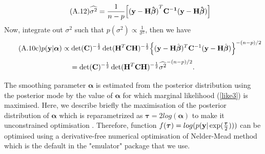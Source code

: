 \documentclass[12pt,titlepage]{report}
\newcommand{\bH}{{\bf H}}
\newcommand{\bC}{{\bf C}}
\newcommand{\by}{{\bf y}}
\newcommand{\hbbeta}{{\hat{\boldsymbol{\beta}}}}
\newcommand{\btau}{{{\boldsymbol{\tau}}}}
\theoremstyle{definition}
\theoremstyle{remark}
\begin{document}
\begin{equation}\tag{A.12}
\widehat{\sigma^2}=\frac{1}{n-p}\Big[\mathbf{(y-H\hat{\boldsymbol \beta})}^T\bf C^{-1}(\bf y-H\hat{\boldsymbol \beta})\Big]
\end{equation}
Now, integrate out $\sigma^2$ such that $p(\sigma^2) \propto \frac{1}{\sigma^2}$, then we have
\begin{equation}\tag{A.10c}\label{like3}
p(\by|\boldsymbol{\alpha})\propto \det(\bC)^{-\frac{1}{2}}\det(\bH^T\bC\bH)^{-\frac{1}{2}} \Big \{(\by-\bH\hbbeta)^T \bC^{-1}(\by-\bH\hbbeta)\Big\}^{-(n-p)/2}
\end{equation}
$$=\det(\bC)^{-\frac{1}{2}}\det(\bH^T\bC\bH)^{-\frac{1}{2}} {\widehat{\sigma^2}}^{-(n-p)/2}.$$


The smoothing parameter $\boldsymbol{\alpha}$ is estimated from the posterior distribution using the posterior mode by the value of $\boldsymbol{\alpha}$ for which marginal likelihood (\ref{like3}) is maximised. Here, we describe briefly the maximisation of the posterior distribution of $\boldsymbol{\alpha}$ which is reparametrized as $\btau=2log(\boldsymbol{\alpha})$ to make it unconstrained optimisation \citep{pd7, pd5}. 
Therefore, function $f(\btau)=log(p(\by|\exp(\frac{\btau}{2})))$ can be optimised using a derivative-free numerical optimisation of Nelder-Mead method which is the default in the "emulator" package that we use.
\end{document}
